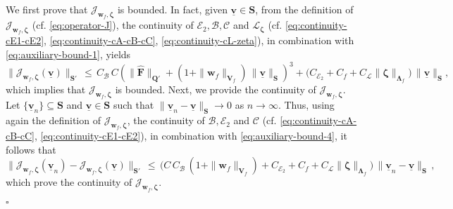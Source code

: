 \documentclass[11pt]{article}
\numberwithin{equation}{section}
\newcommand{\bLambda}{{\boldsymbol\Lambda}}
\newcommand{\bzeta}{{\boldsymbol\zeta}}
\newcommand{\ubv}{\underline{\bv}}
\newcommand{\bv}{{\mathbf{v}}}
\newcommand{\bw}{{\mathbf{w}}}
\newcommand{\0}{{\mathbf{0}}}
\def\bF{\mathbf{F}}
\def\bV{\mathbf{V}}
\def\bQ{\mathbf{Q}}
\def\bS{\mathbf{S}}
\newcommand{\cB}{\mathcal{B}}
\newcommand{\cC}{\mathcal{C}}
\newcommand{\cE}{\mathcal{E}}
\newcommand{\cJ}{\mathcal{J}}
\newcommand{\cL}{\mathcal{L}}
\def\wh{\widehat}
\newenvironment{proof}{\noindent{\it Proof.}}{\hfill$\square$}
\numberwithin{equation}{section}
\begin{document}
\begin{proof}
We first prove that $\cJ_{\bw_f,\bzeta}$ is bounded.
In fact, given $\ubv\in \bS$, from the definition of $\cJ_{\bw_f,\bzeta}$ (cf. \eqref{eq:operator-J}), the continuity of $\cE_2, \cB, \cC$ and $\cL_{\bzeta}$ (cf. \eqref{eq:continuity-cE1-cE2}, \eqref{eq:continuity-cA-cB-cC}, \eqref{eq:continuity-cL-zeta}), in combination with \eqref{eq:auxiliary-bound-1}, yields
\begin{equation*}
\|\cJ_{\bw_f,\bzeta}(\ubv)\|_{\bS'}
\, \leq \, C_{\cB}\,C \left(\|\wh{\bF}\|_{\bQ'} + (1 + \|\bw_f\|_{\bV_f})\,\|\ubv\|_\bS\right)^3 + \Big(C_{\cE_2} + C_f+ C_{\cL}\|\bzeta\|_{\bLambda_f}\Big)\,\|\ubv\|_\bS,
\end{equation*}
which implies that $\cJ_{\bw_f,\bzeta}$ is bounded.
%
Next, we provide the continuity of $\cJ_{\bw_f,\bzeta}$.
Let $\{\ubv_n\}\subseteq \bS$ and $\ubv\in \bS$ such that $\|\ubv_n - \ubv\|_\bS\to 0$ as $n\to \infty$. 
Thus, using again the definition of $\cJ_{\bw_f,\bzeta}$, the continuity of $\cB, \cE_2$ and $\cC$ (cf. \eqref{eq:continuity-cA-cB-cC}, \eqref{eq:continuity-cE1-cE2}), in  combination with \eqref{eq:auxiliary-bound-4}, it follows that
\begin{equation*}
\|\cJ_{\bw_f,\bzeta}(\ubv_n) - \cJ_{\bw_f,\bzeta}(\ubv)\|_{\bS'}
\,\leq \,  \Big( C\,C_{\cB}\,(1 + \|\bw_f\|_{\bV_f}) + C_{\cE_2} + C_f+C_{\cL}\|\bzeta\|_{\bLambda_f} \Big)\,\|\ubv_n - \ubv\|_\bS \,,
\end{equation*}
which prove the continuity of $\cJ_{\bw_f,\bzeta}$.


\end{proof}
\end{document}
